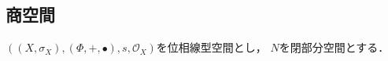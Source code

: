 \subsection{商空間}
	$\left((X,\sigma_X),(\Phi,+,\bullet),s,\mathscr{O}_X\right)$を位相線型空間とし，
	$N$を閉部分空間とする．
	